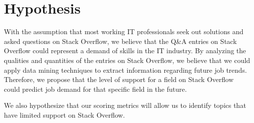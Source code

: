 \section{Hypothesis}
With the assumption that most working IT professionals seek out solutions and asked questions on Stack Overflow, we believe that the Q\&A entries on Stack Overflow could represent a demand of skills in the IT industry. By analyzing the qualities and quantities of the entries on Stack Overflow, we believe that we could apply data mining techniques to extract information regarding future job trends. Therefore, we propose that the level of support for a field on Stack Overflow could predict job demand for that specific field in the future.

We also hypothesize that our scoring metrics will allow us to identify topics that have limited support on Stack Overflow. 
